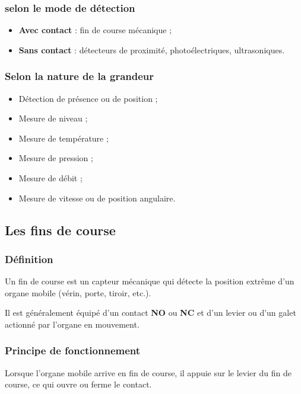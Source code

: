 \subsubsection{selon le mode de détection}

\begin{itemize}
    \item \textbf{Avec contact} : fin de course mécanique ;
    \item \textbf{Sans contact} : détecteurs de proximité, photoélectriques, ultrasoniques.
\end{itemize}

\subsubsection{Selon la nature de la grandeur}

\begin{itemize}
    \item Détection de présence ou de position ;
    \item Mesure de niveau ;
    \item Mesure de température ;
    \item Mesure de pression ;
    \item Mesure de débit ;
    \item Mesure de vitesse ou de position angulaire.
\end{itemize}

\subsection{Les fins de course}

\subsubsection{Définition}

Un fin de course est un capteur mécanique qui détecte la position extrême d'un organe mobile (vérin, porte, tiroir, etc.).

Il est généralement équipé d'un contact \textbf{NO} ou \textbf{NC} et d'un levier ou d'un galet actionné par l'organe en mouvement.

\subsubsection{Principe de fonctionnement}

Lorsque l'organe mobile arrive en fin de course, il appuie sur le levier du fin de course, ce qui ouvre ou ferme le contact.

